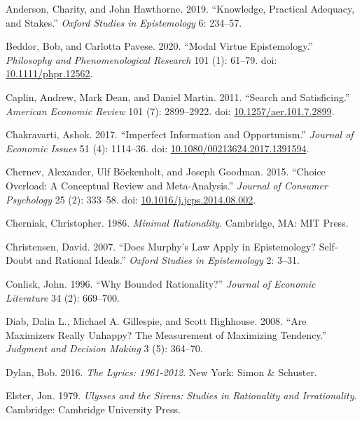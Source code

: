 \documentclass[
  10pt,
  letterpaper,
  DIV=11,
  numbers=noendperiod,
  twoside]{scrartcl}
\newlength{\cslhangindent}
\newenvironment{CSLReferences}[2] %
 {\begin{list}{}{%
  \setlength{\itemindent}{0pt}
  \setlength{\leftmargin}{0pt}
  \setlength{\parsep}{0pt}
  \ifodd #1
   \setlength{\leftmargin}{\cslhangindent}
   \setlength{\itemindent}{-1\cslhangindent}
  \fi
  \setlength{\itemsep}{#2\baselineskip}}}
 {\end{list}}
\begin{document}
\label{refs}
\begin{CSLReferences}{1}{0}
Anderson, Charity, and John Hawthorne. 2019. {``Knowledge, Practical
Adequacy, and Stakes.''} \emph{Oxford Studies in Epistemology} 6:
234--57.

Beddor, Bob, and Carlotta Pavese. 2020. {``Modal Virtue Epistemology.''}
\emph{Philosophy and Phenomenological Research} 101 (1): 61--79. doi:
\href{https://doi.org/10.1111/phpr.12562}{10.1111/phpr.12562}.

Caplin, Andrew, Mark Dean, and Daniel Martin. 2011. {``Search and
Satisficing.''} \emph{American Economic Review} 101 (7): 2899--2922.
doi:
\href{https://doi.org/10.1257/aer.101.7.2899}{10.1257/aer.101.7.2899}.

Chakravarti, Ashok. 2017. {``Imperfect Information and Opportunism.''}
\emph{Journal of Economic Issues} 51 (4): 1114--36. doi:
\href{https://doi.org/10.1080/00213624.2017.1391594}{10.1080/00213624.2017.1391594}.

Chernev, Alexander, Ulf Böckenholt, and Joseph Goodman. 2015. {``Choice
Overload: A Conceptual Review and Meta-Analysis.''} \emph{Journal of
Consumer Psychology} 25 (2): 333--58. doi:
\href{https://doi.org/10.1016/j.jcps.2014.08.002}{10.1016/j.jcps.2014.08.002}.

Cherniak, Christopher. 1986. \emph{Minimal Rationality}. Cambridge, MA:
MIT Press.

Christensen, David. 2007. {``Does Murphy's Law Apply in Epistemology?
Self-Doubt and Rational Ideals.''} \emph{Oxford Studies in Epistemology}
2: 3--31.

Conlisk, John. 1996. {``Why Bounded Rationality?''} \emph{Journal of
Economic Literature} 34 (2): 669--700.

Diab, Dalia L., Michael A. Gillespie, and Scott Highhouse. 2008. {``Are
Maximizers Really Unhappy? The Measurement of Maximizing Tendency.''}
\emph{Judgment and Decision Making} 3 (5): 364--70.

Dylan, Bob. 2016. \emph{The Lyrics: 1961-2012}. New York: Simon \&
Schuster.

Elster, Jon. 1979. \emph{Ulysses and the Sirens: Studies in Rationality
and Irrationality}. Cambridge: Cambridge University Press.


\end{CSLReferences}
\end{document}
